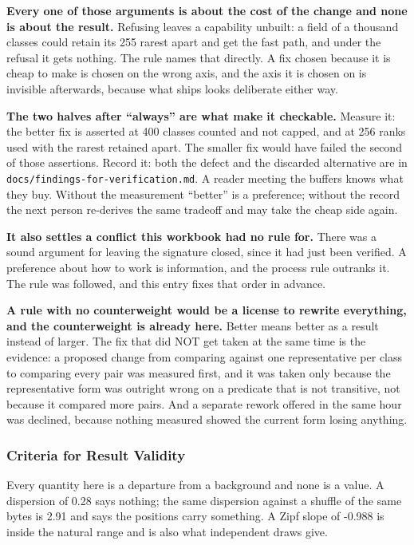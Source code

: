 \textbf{Every one of those arguments is about the cost of the change and none is about the result.} Refusing leaves a capability unbuilt: a field of a thousand classes could retain its 255 rarest apart and get the fast path, and under the refusal it gets nothing. The rule names that directly. A fix chosen because it is cheap to make is chosen on the wrong axis, and the axis it is chosen on is invisible afterwards, because what ships looks deliberate either way.

\textbf{The two halves after ``always'' are what make it checkable.} Measure it: the better fix is asserted at 400 classes counted and not capped, and at 256 ranks used with the rarest retained apart. The smaller fix would have failed the second of those assertions. Record it: both the defect and the discarded alternative are in \texttt{docs/\allowbreak{}findings-for-verification.md}. A reader meeting the buffers knows what they buy. Without the measurement ``better'' is a preference; without the record the next person re-derives the same tradeoff and may take the cheap side again.

\textbf{It also settles a conflict this workbook had no rule for.} There was a sound argument for leaving the signature closed, since it had just been verified. A preference about how to work is information, and the process rule outranks it. The rule was followed, and this entry fixes that order in advance.

\textbf{A rule with no counterweight would be a license to rewrite everything, and the counterweight is already here.} Better means better as a result instead of larger. The fix that did NOT get taken at the same time is the evidence: a proposed change from comparing against one representative per class to comparing every pair was measured first, and it was taken only because the representative form was outright wrong on a predicate that is not transitive, not because it compared more pairs. And a separate rework offered in the same hour was declined, because nothing measured showed the current form losing anything.

\subsubsection{Criteria for Result Validity}

Every quantity here is a departure from a background and none is a value. A dispersion of 0.28 says nothing; the same dispersion against a shuffle of the same bytes is 2.91 and says the positions carry something. A Zipf slope of -0.988 is inside the natural range and is also what independent draws give.

